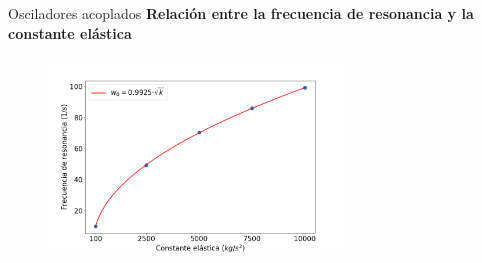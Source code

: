 \begin{frame}{Osciladores acoplados}
    \textbf{Relación entre la frecuencia de resonancia y la constante elástica}
    \begin{figure}
        \centering
        \includegraphics[width=0.7\textwidth]{pic/05-results/prop_relation}
        \label{fig:prop-relation}
    \end{figure}
\end{frame}